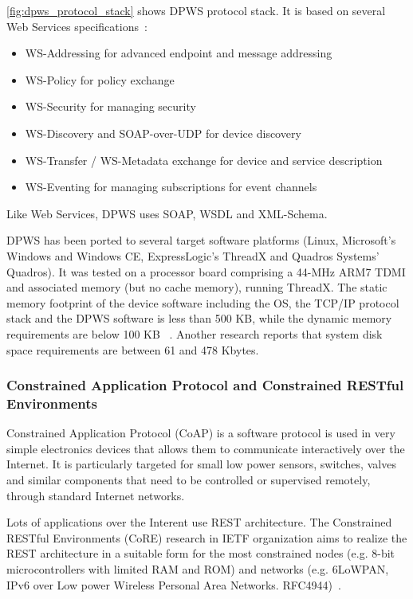 \autoref{fig:dpws_protocol_stack} shows DPWS protocol stack. It is based on  
several Web Services specifications~\cite{ws4d_dpws}:
\begin{itemize}
  \item WS-Addressing for advanced endpoint and message addressing
  \item WS-Policy for policy exchange
  \item WS-Security for managing security
  \item WS-Discovery and SOAP-over-UDP for device discovery
  \item WS-Transfer / WS-Metadata exchange for device and service description
  \item WS-Eventing for managing subscriptions for event channels   
\end{itemize}
    
Like Web Services, DPWS uses SOAP, WSDL and XML-Schema. 


DPWS has been ported to several target software
platforms (Linux, Microsoft's Windows and Windows CE,
ExpressLogic's ThreadX and Quadros Systems' Quadros).
It was tested on a processor board comprising a 44-MHz ARM7
TDMI and associated memory (but no cache memory), running
ThreadX. The static memory footprint of the device software including
the OS, the TCP/IP protocol stack and the DPWS software is
less than 500 KB, while the dynamic memory requirements are
below 100 KB ~\cite{4221180}.    
Another research \cite{5470528} reports that system disk space
requirements are between 61 and 478 Kbytes. 



\subsubsection{Constrained Application Protocol and Constrained RESTful Environments}
\label{sec:CoAP}

Constrained Application Protocol (CoAP) is a software protocol is
used in very simple electronics devices that allows them to communicate interactively over the Internet.
It is particularly targeted for small low power sensors, switches,
valves and similar components that need to be controlled or supervised remotely, through standard Internet networks.

Lots of applications over the Interent use REST architecture.
   The Constrained RESTful Environments (CoRE) research in IETF organization
   aims to realize the REST architecture in a suitable form for the most
   constrained nodes (e.g.  8-bit microcontrollers with limited RAM and ROM) and
   networks (e.g.  6LoWPAN, IPv6 over Low power Wireless Personal Area
   Networks. RFC4944)~\cite{coap_spec}.

